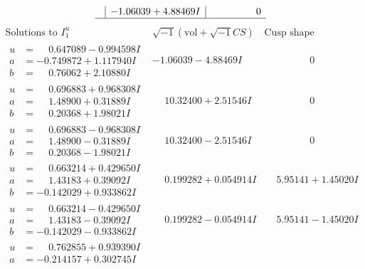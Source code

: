 \documentclass[1p]{elsarticle_modified}
\theoremstyle{definition}
\newcommand{\I}{\sqrt{-1}}
\begin{document}
$$\begin{array}{c|c|c}
 & -1.06039 + 4.88469 I & \phantom{-0.000000 } 0\\
 \hline 
 \end{array}$$\newpage$$\begin{array}{c|c|c}  
\text{Solutions to }I^u_{1}& \I (\text{vol} + \sqrt{-1}CS) & \text{Cusp shape}\\
 \hline 
\begin{aligned}
u &= \phantom{-}0.647089 - 0.994598 I \\
a &= -0.749872 + 1.117940 I \\
b &= \phantom{-}0.76062 + 2.10880 I\end{aligned}
 & -1.06039 - 4.88469 I & \phantom{-0.000000 } 0 \\ \hline\begin{aligned}
u &= \phantom{-}0.696883 + 0.968308 I \\
a &= \phantom{-}1.48900 + 0.31889 I \\
b &= \phantom{-}0.20368 + 1.98021 I\end{aligned}
 & \phantom{-}10.32400 + 2.51546 I & \phantom{-0.000000 } 0 \\ \hline\begin{aligned}
u &= \phantom{-}0.696883 - 0.968308 I \\
a &= \phantom{-}1.48900 - 0.31889 I \\
b &= \phantom{-}0.20368 - 1.98021 I\end{aligned}
 & \phantom{-}10.32400 - 2.51546 I & \phantom{-0.000000 } 0 \\ \hline\begin{aligned}
u &= \phantom{-}0.663214 + 0.429650 I \\
a &= \phantom{-}1.43183 + 0.39092 I \\
b &= -0.142029 + 0.933862 I\end{aligned}
 & \phantom{-}0.199282 + 0.054914 I & \phantom{-}5.95141 + 1.45020 I \\ \hline\begin{aligned}
u &= \phantom{-}0.663214 - 0.429650 I \\
a &= \phantom{-}1.43183 - 0.39092 I \\
b &= -0.142029 - 0.933862 I\end{aligned}
 & \phantom{-}0.199282 - 0.054914 I & \phantom{-}5.95141 - 1.45020 I \\ \hline\begin{aligned}
u &= \phantom{-}0.762855 + 0.939390 I \\
a &= -0.214157 + 0.302745 I \\

\end{aligned}
\end{array}$$
\end{document}
